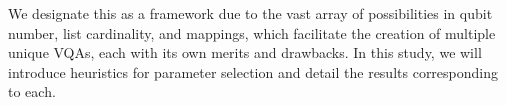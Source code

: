 We designate this as a framework due to the vast array of possibilities in qubit number, list cardinality, and mappings, which facilitate the creation of multiple unique VQAs, each with its own merits and drawbacks. In this study, we will introduce heuristics for parameter selection and detail the results corresponding to each.


